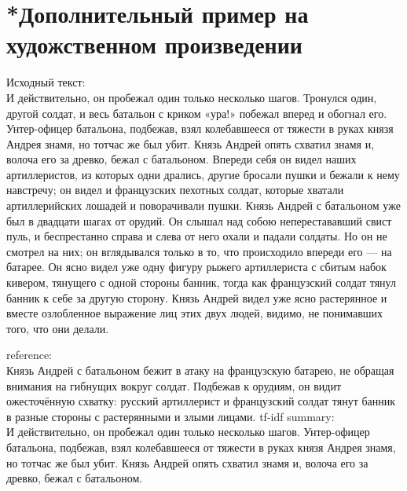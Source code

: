 \documentclass[a4paper]{article}
\begin{document}
\pagebreak

\section{*Дополнительный пример на художственном произведении}
Исходный текст: \\
    \indent И действительно, он пробежал один только несколько шагов. Тронулся один, другой солдат, и весь батальон с криком «ура!» побежал вперед и обогнал его. Унтер-офицер батальона, подбежав, взял колебавшееся от тяжести в руках князя Андрея знамя, но тотчас же был убит. Князь Андрей опять схватил знамя и, волоча его за древко, бежал с батальоном. Впереди себя он видел наших артиллеристов, из которых одни дрались, другие бросали пушки и бежали к нему навстречу; он видел и французских пехотных солдат, которые хватали артиллерийских лошадей и поворачивали пушки. Князь Андрей с батальоном уже был в двадцати шагах от орудий. Он слышал над собою неперестававший свист пуль, и беспрестанно справа и слева от него охали и падали солдаты. Но он не смотрел на них; он вглядывался только в то, что происходило впереди его — на батарее. Он ясно видел уже одну фигуру рыжего артиллериста с сбитым набок кивером, тянущего с одной стороны банник, тогда как французский солдат тянул банник к себе за другую сторону. Князь Андрей видел уже ясно растерянное и вместе озлобленное выражение лиц этих двух людей, видимо, не понимавших того, что они делали.
    \begin{tcolorbox}[title=precision: 0.2564 | recall: 0.2564 | f-measure: 0.2564, fonttitle=\bfseries]
        reference:\\
        Князь Андрей с батальоном бежит в атаку на французскую батарею, не обращая внимания на гибнущих вокруг солдат. Подбежав к орудиям, он видит ожесточённую схватку: русский артиллерист и французский солдат тянут банник в разные стороны с растерянными и злыми лицами.
        \tcblower
        tf-idf summary:\\ 
        И действительно, он пробежал один только несколько шагов. Унтер-офицер батальона, подбежав, взял колебавшееся от тяжести в руках князя Андрея знамя, но тотчас же был убит. Князь Андрей опять схватил знамя и, волоча его за древко, бежал с батальоном.    
    \end{tcolorbox}
\end{document}
